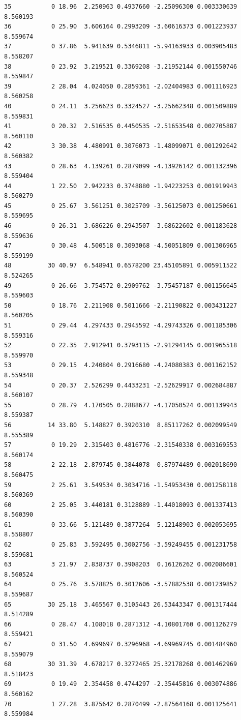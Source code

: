 \documentclass[]{book}
\theoremstyle{definition}
\theoremstyle{definition}
\theoremstyle{definition}
\theoremstyle{remark}
\begin{document}
\begin{verbatim}
35           0 18.96  2.250963 0.4937660 -2.25096300 0.003330639 8.560193
36           0 25.90  3.606164 0.2993209 -3.60616373 0.001223937 8.559674
37           0 37.86  5.941639 0.5346811 -5.94163933 0.003905483 8.558207
38           0 23.92  3.219521 0.3369208 -3.21952144 0.001550746 8.559847
39           2 28.04  4.024050 0.2859361 -2.02404983 0.001116923 8.560258
40           0 24.11  3.256623 0.3324527 -3.25662348 0.001509889 8.559831
41           0 20.32  2.516535 0.4450535 -2.51653548 0.002705887 8.560110
42           3 30.38  4.480991 0.3076073 -1.48099071 0.001292642 8.560382
43           0 28.63  4.139261 0.2879099 -4.13926142 0.001132396 8.559404
44           1 22.50  2.942233 0.3748880 -1.94223253 0.001919943 8.560279
45           0 25.67  3.561251 0.3025709 -3.56125073 0.001250661 8.559695
46           0 26.31  3.686226 0.2943507 -3.68622602 0.001183628 8.559636
47           0 30.48  4.500518 0.3093068 -4.50051809 0.001306965 8.559199
48          30 40.97  6.548941 0.6578200 23.45105891 0.005911522 8.524265
49           0 26.66  3.754572 0.2909762 -3.75457187 0.001156645 8.559603
50           0 18.76  2.211908 0.5011666 -2.21190822 0.003431227 8.560205
51           0 29.44  4.297433 0.2945592 -4.29743326 0.001185306 8.559316
52           0 22.35  2.912941 0.3793115 -2.91294145 0.001965518 8.559970
53           0 29.15  4.240804 0.2916680 -4.24080383 0.001162152 8.559348
54           0 20.37  2.526299 0.4433231 -2.52629917 0.002684887 8.560107
55           0 28.79  4.170505 0.2888677 -4.17050524 0.001139943 8.559387
56          14 33.80  5.148827 0.3920310  8.85117262 0.002099549 8.555389
57           0 19.29  2.315403 0.4816776 -2.31540338 0.003169553 8.560174
58           2 22.18  2.879745 0.3844078 -0.87974489 0.002018690 8.560475
59           2 25.61  3.549534 0.3034716 -1.54953430 0.001258118 8.560369
60           2 25.05  3.440181 0.3128889 -1.44018093 0.001337413 8.560390
61           0 33.66  5.121489 0.3877264 -5.12148903 0.002053695 8.558807
62           0 25.83  3.592495 0.3002756 -3.59249455 0.001231758 8.559681
63           3 21.97  2.838737 0.3908203  0.16126262 0.002086601 8.560524
64           0 25.76  3.578825 0.3012606 -3.57882538 0.001239852 8.559687
65          30 25.18  3.465567 0.3105443 26.53443347 0.001317444 8.514289
66           0 28.47  4.108018 0.2871312 -4.10801760 0.001126279 8.559421
67           0 31.50  4.699697 0.3296968 -4.69969745 0.001484960 8.559079
68          30 31.39  4.678217 0.3272465 25.32178268 0.001462969 8.518423
69           0 19.49  2.354458 0.4744297 -2.35445816 0.003074886 8.560162
70           1 27.28  3.875642 0.2870499 -2.87564168 0.001125641 8.559984

\end{verbatim}
\end{document}
